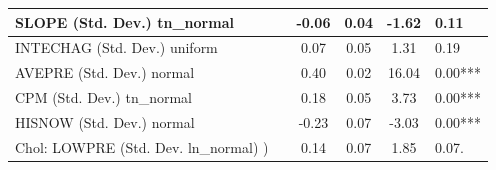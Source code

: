 \begin{table}
\begin{center}
\begin{tabular}{|l|l|c|c|c|l|}
			\hline
			SLOPE (Std. Dev.) tn_normal &  & -0.06 & 0.04 & -1.62 & 0.11 \\
			\hline
			INTECHAG (Std. Dev.) uniform &  & 0.07 & 0.05 & 1.31 & 0.19 \\
			\hline
			AVEPRE (Std. Dev.) normal &  & 0.40 & 0.02 & 16.04 & 0.00*** \\
			\hline
			CPM (Std. Dev.) tn_normal &  & 0.18 & 0.05 & 3.73 & 0.00*** \\
			\hline
			HISNOW (Std. Dev.) normal &  & -0.23 & 0.07 & -3.03 & 0.00*** \\
			\hline
			 Chol: LOWPRE (Std. Dev. ln_normal) ) &  & 0.14 & 0.07 & 1.85 & 0.07. \\
			\hline
		\end{tabular}
	\end{center}
\end{table}